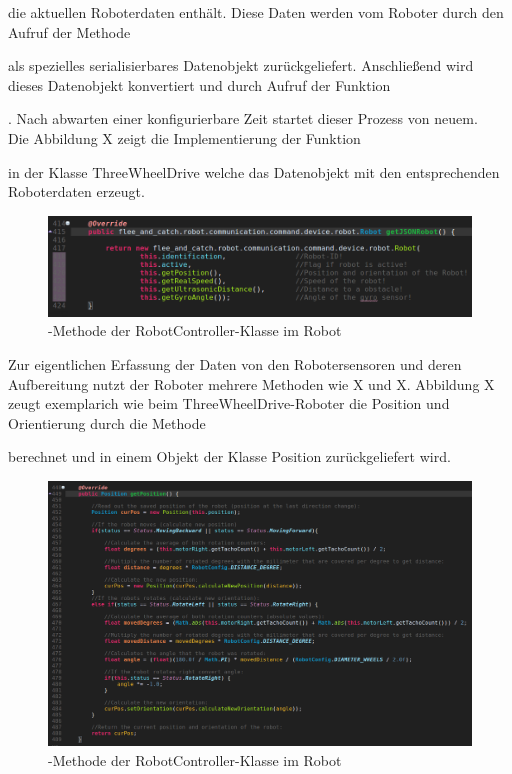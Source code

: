 die aktuellen Roboterdaten enthält. Diese Daten werden vom Roboter durch den Aufruf der Methode { als spezielles serialisierbares 
Datenobjekt zurückgeliefert. Anschließend wird dieses Datenobjekt konvertiert und durch Aufruf der Funktion {. Nach abwarten einer 
konfigurierbare Zeit startet dieser Prozess von neuem. \\
Die Abbildung X zeigt die Implementierung der Funktion { in der Klasse ThreeWheelDrive welche das Datenobjekt mit den 
entsprechenden Roboterdaten erzeugt.
\begin{figure}[ht]
	\centering
	\includegraphics[width=1.0\textwidth]{images/implementation/getJSONRobotMethod.png}
	\caption[-Methode der RobotController-Klasse im Robot]{-Methode der RobotController-Klasse im Robot}
\end{figure}
Zur eigentlichen Erfassung der Daten von den Robotersensoren und deren Aufbereitung nutzt der Roboter mehrere Methoden wie X und X.
Abbildung X zeugt exemplarich wie beim ThreeWheelDrive-Roboter die Position und Orientierung durch die Methode { berechnet und
in einem Objekt der Klasse Position zurückgeliefert wird.
\begin{figure}[ht]
	\centering
	\includegraphics[width=1.0\textwidth]{images/implementation/getPositionMethod.png}
	\caption[-Methode der RobotController-Klasse im Robot]{-Methode der RobotController-Klasse im Robot}

\end{figure}}}}}

